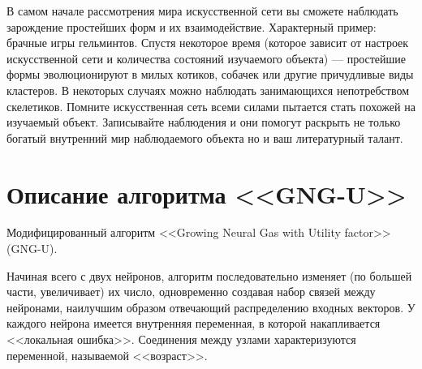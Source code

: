 \documentclass[unicode, 12pt, a4paper,oneside,fleqn]{article}
\begin{document}
В самом начале рассмотрения мира искусственной сети вы сможете
наблюдать зарождение простейших форм и их взаимодействие. Характерный
пример: брачные игры гельминтов. Спустя некоторое время (которое
зависит от настроек искусственной сети и количества состояний
изучаемого объекта) --- простейшие формы эволюционируют в милых
котиков, собачек или другие причудливые виды кластеров. В некоторых
случаях можно наблюдать занимающихся непотребством скелетиков. Помните
искусственная сеть всеми силами пытается стать похожей на изучаемый
объект. Записывайте наблюдения и они помогут раскрыть не только
богатый внутренний мир наблюдаемого объекта но и ваш литературный
талант.



\section{Описание алгоритма <<GNG-U>>}
Модифицированный алгоритм <<Growing Neural Gas with Utility factor>>
(GNG-U).

Начиная всего с двух нейронов, алгоритм последовательно изменяет (по
большей части, увеличивает) их число, одновременно создавая набор
связей между нейронами, наилучшим образом отвечающий распределению
входных векторов. У каждого нейрона имеется внутренняя переменная, в
которой накапливается <<локальная ошибка>>. Соединения между узлами
характеризуются переменной, называемой <<возраст>>.
\end{document}
